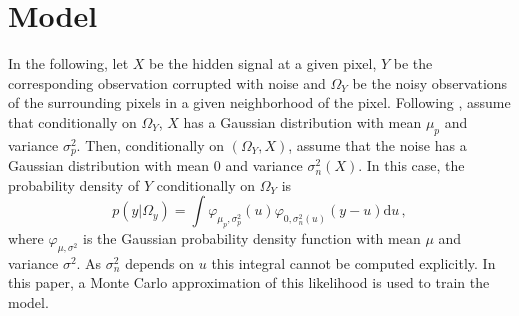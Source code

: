\documentclass[review]{cvpr}
\begin{document}
\section{Model}
\label{sec:model}
In the following, let $X$ be the hidden signal at a given pixel, $Y$ be the corresponding observation corrupted with noise and $\Omega_Y$ be the noisy observations of the surrounding pixels in a given neighborhood of the pixel. Following \cite{laine2019high}, assume that conditionally on $\Omega_Y$, $X$ has a Gaussian distribution with mean $\mu_p$ and variance $\sigma_p^2$. Then, conditionally on $(\Omega_Y,X)$, assume that the noise has a Gaussian distribution with mean $0$ and variance $\sigma_n^2(X)$. In this case, the probability density of $Y$ conditionally on $\Omega_Y$ is
$$
p(y|\Omega_y) = \int \varphi_{\mu_p,\sigma_p^2}(u)\varphi_{0,\sigma_n^2(u)}(y-u)\mathrm{d}u\,,
$$
where $\varphi_{\mu,\sigma^2}$ is the Gaussian probability density function with mean $\mu$ and variance $\sigma^2$.
As $\sigma_n^2$ depends on $u$ this integral cannot be computed explicitly. In this paper, a Monte Carlo approximation of this likelihood is used to train the model.
\end{document}
